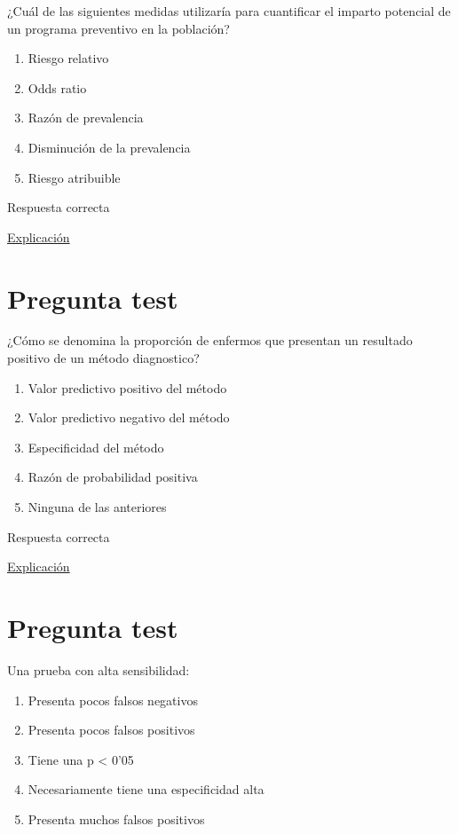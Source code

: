 \documentclass[
]{book}
\providecommand{\tightlist}{%
  \setlength{\itemsep}{0pt}\setlength{\parskip}{0pt}}
\begin{document}
¿Cuál de las siguientes medidas utilizaría para cuantificar el imparto potencial de un programa preventivo en la población?

\begin{enumerate}
\def\labelenumi{\alph{enumi})}
\tightlist
\item
  Riesgo relativo
\item
  Odds ratio
\item
  Razón de prevalencia
\item
  Disminución de la prevalencia
\item
  Riesgo atribuible
\end{enumerate}

Respuesta correcta

\href{https://es.wikipedia.org/wiki/Riesgo_atribuible}{Explicación}

\hypertarget{pregunta-test-96}{%
\section{Pregunta test}\label{pregunta-test-96}}

¿Cómo se denomina la proporción de enfermos que presentan un resultado positivo de un método diagnostico?

\begin{enumerate}
\def\labelenumi{\alph{enumi})}
\tightlist
\item
  Valor predictivo positivo del método
\item
  Valor predictivo negativo del método
\item
  Especificidad del método
\item
  Razón de probabilidad positiva
\item
  Ninguna de las anteriores
\end{enumerate}

Respuesta correcta

\href{https://1fjmanzano.github.io/bioestadistica/relaci\%C3\%B3n-entre-variables-cualitativas.html\#diagno\%CC\%81stico-cli\%CC\%81nico}{Explicación}

\hypertarget{pregunta-test-97}{%
\section{Pregunta test}\label{pregunta-test-97}}

Una prueba con alta sensibilidad:

\begin{enumerate}
\def\labelenumi{\alph{enumi})}
\tightlist
\item
  Presenta pocos falsos negativos
\item
  Presenta pocos falsos positivos
\item
  Tiene una p \textless{} 0'05
\item
  Necesariamente tiene una especificidad alta
\item
  Presenta muchos falsos positivos
\end{enumerate}
\end{document}
